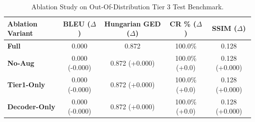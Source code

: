 \begin{table}[h]
\centering
\small
\caption{Ablation Study on Out-Of-Distribution Tier 3 Test Benchmark.}
\label{tab:ablation_study}
\begin{tabular}{lcccc}
\toprule
Ablation Variant & BLEU ($\Delta$) & Hungarian GED ($\Delta$) & CR \% ($\Delta$) & SSIM ($\Delta$) \\
\midrule
\textbf{Full} & 0.000 & 0.872 & 100.0\% & 0.128 \\
\textbf{No-Aug} & 0.000 (-0.000) & 0.872 (+0.000) & 100.0\% (+0.0) & 0.128 (+0.000) \\
\textbf{Tier1-Only} & 0.000 (-0.000) & 0.872 (+0.000) & 100.0\% (+0.0) & 0.128 (+0.000) \\
\textbf{Decoder-Only} & 0.000 (-0.000) & 0.872 (+0.000) & 100.0\% (+0.0) & 0.128 (+0.000) \\
\bottomrule
\end{tabular}
\end{table}

